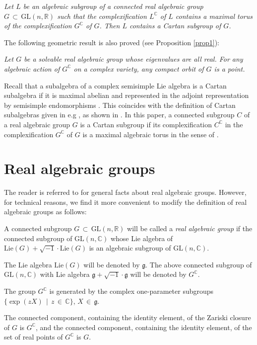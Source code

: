 \documentclass[12pt]{amsart}
\begin{document}
\textit{Let $L$ be an algebraic subgroup of a connected real algebraic group
$G\, \subset\,\mathrm{GL}(n, {\mathbb{R}})$ such that the complexification
$L^{\mathbb{C}}$ of $L$ contains a maximal torus of the complexification
$G^{\mathbb{C}}$ of $G$. Then $L$ contains a Cartan subgroup of $G$.}

The following geometric result is also proved (see Proposition \ref{prop1}):

\textit{Let $G$ be a solvable real algebraic group whose eigenvalues are all
real. For any algebraic action of $G^{\mathbb{C}}$ on a complex variety, any
compact orbit of $G$ is a point.}

Recall that a subalgebra of a complex semisimple Lie algebra is a Cartan
subalgebra if it is maximal abelian and represented in the adjoint
representation by semisimple endomorphisms \cite[p. 162]{He}. This coincides
with the definition of Cartan subalgebras given in e.g \cite[p. 133]{Kn}, as
shown in \cite[p. 135]{Kn}. In this paper, a connected subgroup $C$ of a
real algebraic group $G$ is a Cartan subgroup if its complexification
$C^{\mathbb{C}}$ in the complexification $G^{\mathbb{C}}$ of $G$ is a maximal
algebraic torus in the sense of \cite[p. 133]{OV}.

\section{Real algebraic groups}

The reader is referred to \cite{OV} for general facts about real algebraic
groups. However, for technical reasons, we find it more convenient to modify
the definition of real algebraic groups as follows:

A connected subgroup $G\, \subset\, \text{GL}(n, {\mathbb{R}})$ will be
called a \textit{real algebraic group} if the connected subgroup of
$\text{GL}(n, {\mathbb{C}})$ whose Lie algebra of $\text{Lie}(G)+ \sqrt{-1}\cdot
\text{Lie}(G)$ is an algebraic subgroup of $\text{GL}(n, {\mathbb{C}})$.

The Lie algebra $\text{Lie}(G)$ will be denoted by $\mathfrak{g}$. The above
connected subgroup of $\text{GL}(n, {\mathbb{C}})$ with Lie algebra
${\mathfrak{g}}+ \sqrt{-1}\cdot{\mathfrak{g}}$ will be denoted by $G^{\mathbb{C}}$.

The group $G^{\mathbb{C}}$ is generated by the complex one-parameter
subgroups $\{\exp(zX)\,\mid\, z\,\in\, {\mathbb{C}}\}$, $X\, \in\, \mathfrak{g}$.

The connected component, containing the identity element, of the Zariski
closure of $G$ is $G^{\mathbb{C}}$, and the connected component, containing
the identity element, of the set of real points of $G^{\mathbb{C}}$ is $G$.
\end{document}
